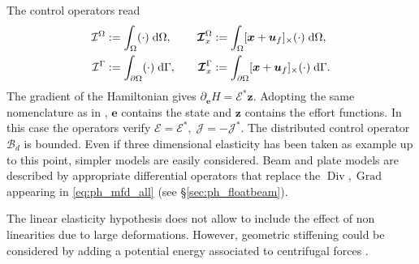 \documentclass{svjour3}                     %
\newcommand{\secref}[1]{\S\ref{#1}}
\DeclareMathOperator*{\Grad}{Grad}
\DeclareMathOperator*{\Div}{Div}
\newcommand{\crmat}[1]{\ensuremath{[#1]_{\times}}}
\begin{document}
The control operators read
\begin{equation*}
\begin{aligned}
\mathcal{I}^\Omega &:=\int_{\Omega} (\cdot) \d{\Omega}, \\
\mathcal{I}^\Gamma &:= \int_{\partial \Omega} (\cdot) \d{\Gamma}, \\
\end{aligned} \qquad
\begin{aligned} 
\bm{\mathcal{I}}_{x}^\Omega &:=\int_{\Omega} \crmat{\bm{x}+\bm{u}_f} (\cdot) \d{\Omega}, \\
\bm{\mathcal{I}}_{x}^\Gamma &:=\int_{\partial \Omega} \crmat{\bm{x}+\bm{u}_f} (\cdot) \d{\Gamma}. \\
\end{aligned}
\end{equation*}
The gradient of the Hamiltonian  gives $\partial_{\bm{e}} H = \bm{\mathcal{E}}^* \bm{z}$. Adopting the same nomenclature as in \cite{mehrmann2019structurepreserving}, $\bm{e}$ contains the state and $\bm{z}$ contains the effort functions. In this case the operators verify $\bm{\mathcal{E}} = \bm{\mathcal{E}}^*, \; \bm{\mathcal{J}} = -\bm{\mathcal{J}}^*$. The distributed control operator $\bm{\mathcal{B}}_d$ is bounded. Even if three dimensional elasticity has been taken as example up to this point, simpler models are easily considered. Beam and plate models \cite{BRUGNOLI2019940,BRUGNOLI2019961} are described by appropriate differential operators that replace the $\Div, \Grad$ appearing in \eqref{eq:ph_mfd_all} (see \secref{sec:ph_floatbeam}).

\begin{remark}
	The linear elasticity hypothesis does not allow to include the effect of non linearities due to large deformations.  However, geometric stiffening could be considered by adding a potential energy associated to centrifugal forces \cite{YIGIT1988201}. 
\end{remark}
\end{document}
